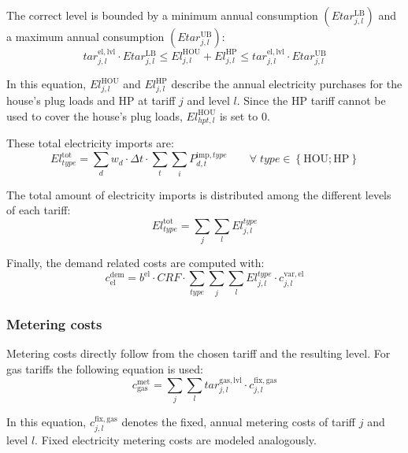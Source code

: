 The correct level is bounded by a minimum annual consumption $\left(Etar^\mathrm{LB}_{j,l}\right)$ and a maximum annual consumption $\left(Etar^\mathrm{UB}_{j,l}\right)$:
\begin{equation}
tar^\mathrm{el,lvl}_{j,l} \cdot Etar^\mathrm{LB}_{j,l} \le El^\mathrm{HOU}_{j,l} + El^\mathrm{HP}_{j,l} \le tar^\mathrm{el,lvl}_{j,l} \cdot Etar^\mathrm{UB}_{j,l}
\end{equation}

In this equation, $El^\mathrm{HOU}_{j,l}$ and $El^\mathrm{HP}_{j,l}$ describe the annual electricity purchases for the house's plug loads and HP at tariff $j$ and level $l$.
Since the HP tariff cannot be used to cover the house's plug loads, $El^\mathrm{HOU}_{hpt,l}$ is set to 0.

These total electricity imports are:
\begin{equation}
	El^\mathrm{tot}_{type} = \sum\limits_{d} w_d \cdot \Delta t \cdot \sum\limits_{t} \sum\limits_{i} P^{\mathrm{imp,}type}_{d,t} \qquad \forall \; type \in \left\lbrace\mathrm{HOU; HP}\right\rbrace
\end{equation}

The total amount of electricity imports is distributed among the different levels of each tariff:
\begin{equation}
	El^\mathrm{tot}_{type} = \sum\limits_{j} \sum\limits_{l} El^{type}_{j,l}
\end{equation}

Finally, the demand related costs are computed with:
\begin{equation}
c^{\mathrm{dem}}_\mathrm{el} = b^{\mathrm{el}} \cdot CRF \cdot \sum\limits_{type} \sum\limits_{j} \sum\limits_{l} El^{type}_{j,l} \cdot c^\mathrm{var,el}_{j,l}
\end{equation}

\subsubsection{Metering costs}

Metering costs directly follow from the chosen tariff and the resulting level. For gas tariffs the following equation is used:
\begin{equation}
	c^\mathrm{met}_{\mathrm{gas}} = \sum\limits_{j} \sum\limits_{l} tar^\mathrm{gas,lvl}_{j,l} \cdot c^\mathrm{fix,gas}_{j,l}
\end{equation}

In this equation, $c^\mathrm{fix,gas}_{j,l}$ denotes the fixed, annual metering costs of tariff $j$ and level $l$.
Fixed electricity metering costs are modeled analogously.

